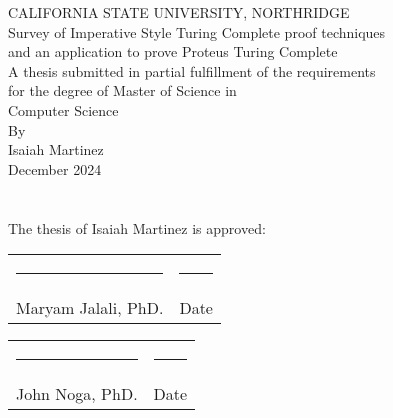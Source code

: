 \documentclass[12pt]{report} %
\begin{document}
    \begin{titlepage}
        \centering
        CALIFORNIA STATE UNIVERSITY, NORTHRIDGE\\
        [1.5in]
        Survey of Imperative Style Turing Complete proof techniques\\
        and an application to prove Proteus Turing Complete\\
        [1.5in]
        A thesis submitted in partial fulfillment of the requirements\\
        for the degree of Master of Science in\\
        Computer Science\\
        [0.5in]
        By\\
        [0.25in]
        Isaiah Martinez\\
        \vspace{\fill}
        December 2024
    \end{titlepage}

    \newpage
    \setcounter{page}{2} %

    \chapter*{}\label{chapter:SignPage}
        
        
        \hspace{0.9in}
        The thesis of Isaiah Martinez is approved:
        \vspace{2in}

        \begin{center}
            \begin{tabular}{p{3in} p{1in}}
                \rule{3in}{0.4pt} & \rule{1in}{0.4pt}\\
                Maryam Jalali, PhD. & Date \\
            \end{tabular}
        \end{center}

        \begin{center}
            \begin{tabular}{p{3in} p{1in}}
                \rule{3in}{0.4pt} & \rule{1in}{0.4pt}\\
                John Noga, PhD. & Date \\
            \end{tabular}
        \end{center}
\end{document}
